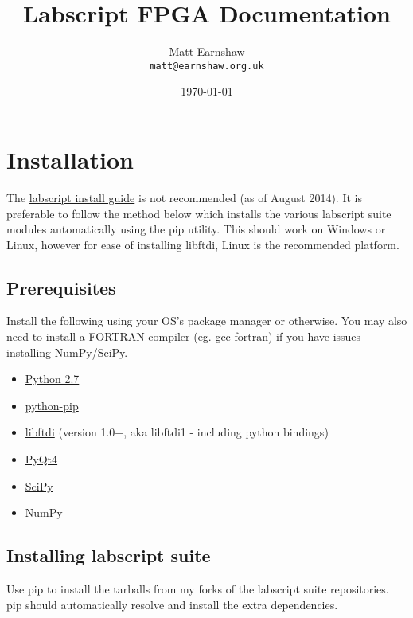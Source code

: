 \documentclass[11pt,a4paper]{article}
\begin{document}
\title{Labscript FPGA Documentation}
\author{Matt Earnshaw \\ \texttt{matt@earnshaw.org.uk}}
\date{\mydate\today}
\maketitle

\tableofcontents 
\newpage

\section{Installation}
The \href{https://bitbucket.org/labscript_suite/install-guide/src}{labscript install guide} is not recommended (as of August 2014). It is preferable to follow the method below which installs the various labscript suite modules automatically using the pip utility. This should work on Windows or Linux, however for ease of installing libftdi, Linux is the recommended platform.

\subsection{Prerequisites}
Install the following using your OS's package manager or otherwise. You may also need to install a FORTRAN compiler (eg. gcc-fortran) if you have issues installing NumPy/SciPy.

\begin{itemize}
\itemsep1pt\parskip0pt
\item \href{http://www.python.org}{Python 2.7}
\item \href{https://pypi.python.org/pypi/pip}{python-pip}
\item \href{http://www.intra2net.com/en/developer/libftdi/}{libftdi} (version 1.0+, aka libftdi1 - including python bindings)
\item \href{http://www.intra2net.com/en/developer/libftdi/}{PyQt4}
\item \href{http://www.scipy.org}{SciPy}
\item \href{http://www.numpy.org}{NumPy}
\end{itemize}


\subsection{Installing labscript suite}
Use pip to install the tarballs from my forks of the labscript suite repositories. pip should automatically resolve and install the extra dependencies. 
\end{document}
